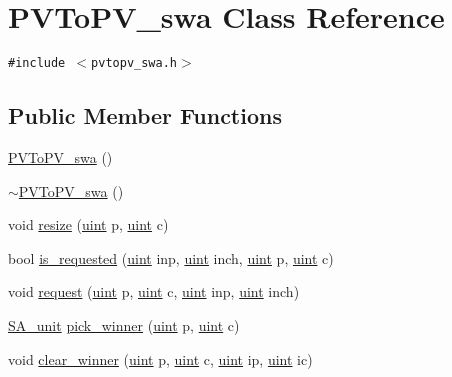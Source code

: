 \hypertarget{classPVToPV__swa}{
\section{PVToPV\_\-swa Class Reference}
\label{classPVToPV__swa}
}
{\tt \#include $<$pvtopv\_\-swa.h$>$}

\subsection*{Public Member Functions}
\begin{CompactItemize}
\item 
\hyperlink{classPVToPV__swa_e61260956d80cbb85fbc88cc4405cbb1}{PVToPV\_\-swa} ()
\item 
\hyperlink{classPVToPV__swa_cf2004091e12ac26b24e31124337e989}{$\sim$PVToPV\_\-swa} ()
\item 
void \hyperlink{classPVToPV__swa_f3763d9d6f2c33078a4b0dbe414f4724}{resize} (\hyperlink{outputBuffer_8h_91ad9478d81a7aaf2593e8d9c3d06a14}{uint} p, \hyperlink{outputBuffer_8h_91ad9478d81a7aaf2593e8d9c3d06a14}{uint} c)
\item 
bool \hyperlink{classPVToPV__swa_bc1410b2178d02ce2bacba66707e1b1e}{is\_\-requested} (\hyperlink{outputBuffer_8h_91ad9478d81a7aaf2593e8d9c3d06a14}{uint} inp, \hyperlink{outputBuffer_8h_91ad9478d81a7aaf2593e8d9c3d06a14}{uint} inch, \hyperlink{outputBuffer_8h_91ad9478d81a7aaf2593e8d9c3d06a14}{uint} p, \hyperlink{outputBuffer_8h_91ad9478d81a7aaf2593e8d9c3d06a14}{uint} c)
\item 
void \hyperlink{classPVToPV__swa_d0090325f9ce86b633ddc400910ad30c}{request} (\hyperlink{outputBuffer_8h_91ad9478d81a7aaf2593e8d9c3d06a14}{uint} p, \hyperlink{outputBuffer_8h_91ad9478d81a7aaf2593e8d9c3d06a14}{uint} c, \hyperlink{outputBuffer_8h_91ad9478d81a7aaf2593e8d9c3d06a14}{uint} inp, \hyperlink{outputBuffer_8h_91ad9478d81a7aaf2593e8d9c3d06a14}{uint} inch)
\item 
\hyperlink{classSA__unit}{SA\_\-unit} \hyperlink{classPVToPV__swa_957d1cb1cd6ffa264749dd89e2ae1cd1}{pick\_\-winner} (\hyperlink{outputBuffer_8h_91ad9478d81a7aaf2593e8d9c3d06a14}{uint} p, \hyperlink{outputBuffer_8h_91ad9478d81a7aaf2593e8d9c3d06a14}{uint} c)
\item 
void \hyperlink{classPVToPV__swa_16391cc301306acef66eff1ab847c7ca}{clear\_\-winner} (\hyperlink{outputBuffer_8h_91ad9478d81a7aaf2593e8d9c3d06a14}{uint} p, \hyperlink{outputBuffer_8h_91ad9478d81a7aaf2593e8d9c3d06a14}{uint} c, \hyperlink{outputBuffer_8h_91ad9478d81a7aaf2593e8d9c3d06a14}{uint} ip, \hyperlink{outputBuffer_8h_91ad9478d81a7aaf2593e8d9c3d06a14}{uint} ic)

\end{CompactItemize}
